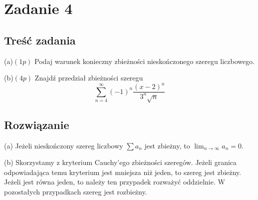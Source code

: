 \documentclass[12pt]{article}
\begin{document}
\section{Zadanie 4}
\subsection{Treść zadania}
(a)$(1p)$ Podaj warunek konieczny zbieżności nieskończonego szeregu liczbowego.

(b)$(4p)$ Znajdź przedział zbieżności szeregu
\[\sum_{n=4}^\infty (-1)^n\frac{(x-2)^n}{3^n\sqrt{n}}\]

\subsection{Rozwiązanie}
(a) Jeżeli nieskończony szereg liczbowy $\displaystyle \sum a_n$ jest zbieżny, to $\displaystyle \lim_{n\to\infty} a_n = 0$.

(b) Skorzystamy z kryterium Cauchy'ego zbieżności szeregów. Jeżeli granica odpowiadająca temu kryterium jest mniejsza niż jeden, to szereg jest zbieżny. Jeżeli jest równa jeden, to należy ten przypadek rozważyć oddzielnie. W pozostałych przypadkach szereg jest rozbieżny.
\end{document}
